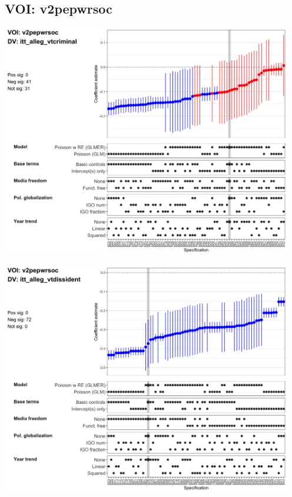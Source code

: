 \documentclass[]{article}
\begin{document}
\hypertarget{voi-v2pepwrsoc}{%
\subsection{VOI: v2pepwrsoc}\label{voi-v2pepwrsoc}}

\includegraphics[height=4in]{../output/figures-robustness/specplot-v2pepwrsoc-itt_alleg_vtcriminal.png}

\includegraphics[height=4in]{../output/figures-robustness/specplot-v2pepwrsoc-itt_alleg_vtdissident.png}
\end{document}

